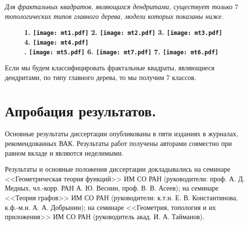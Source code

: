 {\em Для фрактальных квадратов, являющихся дендритами, существует только $7$ топологических типов главного дерева, модели которых показаны ниже.}
\begin{figure}[H]
    \centering \Large {\bf
    1. \texttt{[image: mt1.pdf]}
    \hfill
    2. \texttt{[image: mt2.pdf]}
    \hfill
    3. \texttt{[image: mt3.pdf]}
    \hfill
    4. \texttt{[image: mt4.pdf]}\\
    . \texttt{[image: mt5.pdf]}
    \hfill
    6. \texttt{[image: mt7.pdf]}
    \hfill
    7. \texttt{[image: mt6.pdf]}}
\end{figure}

Если мы будем классифицировать фрактальные квадраты, являющиеся дендритами, по типу главного дерева, то мы получим 7 классов.




\section{Апробация результатов.}

Основные результаты диссертации опубликованы в пяти изданиях \cite{DST2021, DST2022, TD2022fs, TD2023fs, VDT2020} в журналах, рекомендованных ВАК.
Результаты работ \cite{DST2021, DST2022, TD2022fs, TD2023fs, VDT2020} получены авторами совместно при равном вкладе и являются неделимыми.

Результаты и основные положения диссертации докладывались на семинаре <<Геометрическая теория функций>> ИМ СО РАН (руководители:
проф. А. Д. Медных, чл.-корр. РАН А. Ю. Веснин, проф. В. В. Асеев); на семинаре <<Теория графов>> ИМ СО РАН (руководители: к.т.н. Е. В. Константинова, к.ф.-м.н. А. А. Добрынин); на семинаре <<Геометрия, топология и их приложения>> ИМ СО РАН (руководитель акад. И. А. Тайманов).

